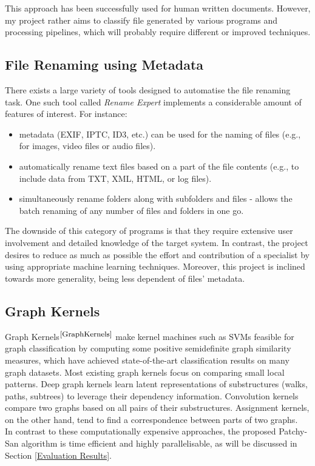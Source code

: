 This approach has been successfully used for human written documents. However, my project rather aims to classify file generated by various programs and processing pipelines, which will probably require different or improved techniques. \\

\subsection{File Renaming using Metadata}

There exists a large variety of tools designed to automatise the file renaming task. One such tool called \textit{Rename Expert} implements a considerable amount of features of interest. For instance:

\begin{itemize}
  \item metadata (EXIF, IPTC, ID3, etc.) can be used for the naming of files (e.g., for images, video files or audio files).
  \item automatically rename text files based on a part of the file contents (e.g., to include data from TXT, XML, HTML, or log files).
  \item simultaneously rename folders along with subfolders and files - allows the batch renaming of any number of files and folders in one go.
\end{itemize}

The downside of this category of programs is that they require extensive user involvement and detailed knowledge of the target system. In contrast, the project desires to reduce as much as possible the effort and contribution of a specialist by using appropriate machine learning techniques. Moreover, this project is inclined towards more generality, being less dependent of files' metadata. 


\subsection{Graph Kernels}

Graph Kernels$^{\small \cite{GraphKernels}}$ make kernel machines such as SVMs feasible for graph classification by computing some positive semidefinite graph similarity measures, which have achieved state-of-the-art classification results on many graph datasets. Most existing graph kernels focus on comparing small local patterns. Deep graph kernels learn latent representations of substructures (walks, paths, subtrees) to leverage their dependency information. Convolution kernels compare two graphs based on all pairs of their substructures. Assignment kernels, on the other hand, tend to find a correspondence between parts of two graphs. \\

In contrast to these computationally expensive approaches, the proposed Patchy-San algorithm is time efficient and highly parallelisable, as will be discussed in Section \ref{Evaluation Results}.

